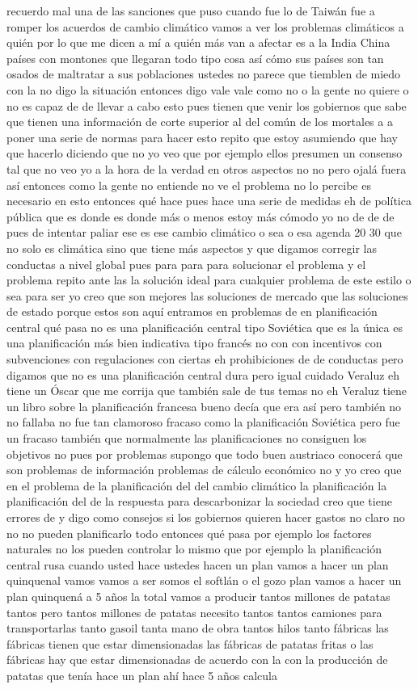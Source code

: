 recuerdo mal una de las sanciones que puso cuando fue lo de Taiwán fue a romper los acuerdos de cambio climático vamos a ver los problemas climáticos a quién por lo que me dicen a mí a quién más van a afectar es a la India China países con montones que llegaran todo tipo cosa así cómo sus países son tan osados de maltratar a sus poblaciones ustedes no parece que tiemblen de miedo con la no digo la situación entonces digo vale vale como no o la gente no quiere o no es capaz de de llevar a cabo esto pues tienen que venir los gobiernos que sabe que tienen una información de corte superior al del común de los mortales a a poner una serie de normas para hacer esto repito que estoy asumiendo que hay que hacerlo diciendo que no yo veo que por ejemplo ellos presumen un consenso tal que no veo yo a la hora de la verdad en otros aspectos no no pero ojalá fuera así entonces como la gente no entiende no ve el problema no lo percibe es necesario en esto entonces qué hace pues hace una serie de medidas eh de política pública que es donde es donde más o menos estoy más cómodo yo no de de de pues de intentar paliar ese es ese cambio climático o sea o esa agenda 20 30 que no solo es climática sino que tiene más aspectos y que digamos corregir las conductas a nivel global pues para para para solucionar el problema y el problema repito ante las la solución ideal para cualquier problema de este estilo o sea para ser yo creo que son mejores las soluciones de mercado que las soluciones de estado porque estos son aquí entramos en problemas de en planificación central qué pasa no es una planificación central tipo Soviética que es la única es una planificación más bien indicativa tipo francés no con con incentivos con subvenciones con regulaciones con ciertas eh prohibiciones de de conductas pero digamos que no es una planificación central dura pero igual cuidado Veraluz eh tiene un Óscar que me corrija que también sale de tus temas no eh Veraluz tiene un libro sobre la planificación francesa bueno decía que era así pero también no no fallaba no fue tan clamoroso fracaso como la planificación Soviética pero fue un fracaso también que normalmente las planificaciones no consiguen los objetivos no pues por problemas supongo que todo buen austriaco conocerá que son problemas de información problemas de cálculo económico no y yo creo que en el problema de la planificación del del cambio climático la planificación la planificación del de la respuesta para descarbonizar la sociedad creo que tiene errores de y digo como consejos si los gobiernos quieren hacer gastos no claro no no no pueden planificarlo todo entonces qué pasa por ejemplo los factores naturales no los pueden controlar lo mismo que por ejemplo la planificación central rusa cuando usted hace ustedes hacen un plan vamos a hacer un plan quinquenal vamos vamos a ser somos el softlán o el gozo plan vamos a hacer un plan quinquená a 5 años la total vamos a producir tantos millones de patatas tantos pero tantos millones de patatas necesito tantos tantos camiones para transportarlas tanto gasoil tanta mano de obra tantos hilos tanto fábricas las fábricas tienen que estar dimensionadas las fábricas de patatas fritas o las fábricas hay que estar dimensionadas de acuerdo con la con la producción de patatas que tenía hace un plan ahí hace 5 años calcula 